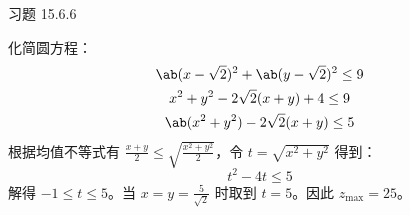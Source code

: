 \begin{problem}
    习题 15.6.6
    \begin{solution}
        化简圆方程：
        $$
        \begin{gathered}
            \ab(x - \sqrt{2})^2 + \ab(y - \sqrt{2})^2 \le 9 \\
            x^2 + y^2 - 2 \sqrt{2} (x + y) + 4 \le 9 \\
            \ab(x^2 + y^2) - 2 \sqrt{2} (x + y) \le 5
        \end{gathered}
        $$
        根据均值不等式有 $\frac{x + y}{2} \le \sqrt{\frac{x^2 + y^2}{2}}$，令 $t = \sqrt{x^2 + y^2}$ 得到：
        $$
        t^2 - 4t \le 5
        $$
        解得 $-1 \le t \le 5$。当 $x = y = \frac{5}{\sqrt{2}}$ 时取到 $t = 5$。因此 $z_{\max} = 25$。
    \end{solution}
\end{problem}